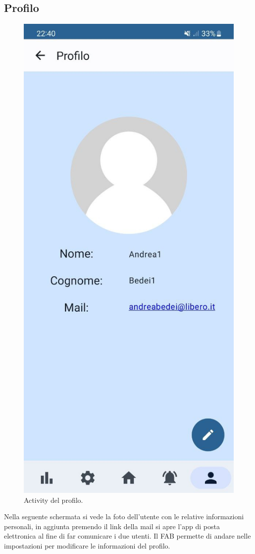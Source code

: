 \documentclass[a4paper,final,12pt]{report}
\begin{document}
\subsection{Profilo}
\begin{figure}[hbtp]
\centering
\includegraphics[scale=0.20]{img_concettuale/prmob.jpg}
\caption{Activity del profilo.}
\end{figure}
Nella seguente schermata si vede la foto dell'utente con le relative informazioni personali, in aggiunta premendo il link della mail si apre l'app di posta elettronica al fine di far comunicare i due utenti. Il FAB permette di andare nelle impostazioni per modificare le informazioni del profilo.
\end{document}
